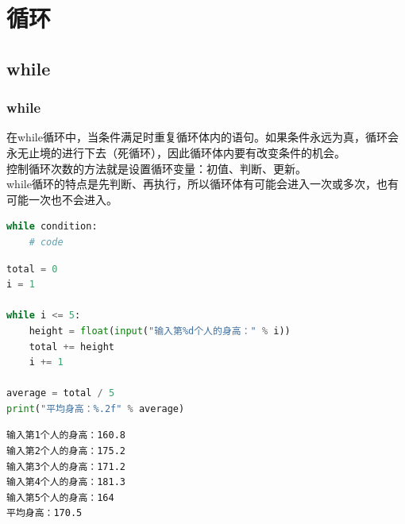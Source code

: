 \chapter{循环}

\section{while}

\subsection{while}

在while循环中，当条件满足时重复循环体内的语句。如果条件永远为真，循环会永无止境的进行下去（死循环），因此循环体内要有改变条件的机会。\\

控制循环次数的方法就是设置循环变量：初值、判断、更新。\\

while循环的特点是先判断、再执行，所以循环体有可能会进入一次或多次，也有可能一次也不会进入。

\vspace{-0.5cm}

\begin{lstlisting}[language=Python]
while condition:
    # code
\end{lstlisting}

\vspace{0.5cm}


\begin{lstlisting}[language=Python]
total = 0
i = 1

while i <= 5:
    height = float(input("输入第%d个人的身高：" % i))
    total += height
    i += 1

average = total / 5
print("平均身高：%.2f" % average)
\end{lstlisting}

\begin{tcolorbox}
    \begin{verbatim}
输入第1个人的身高：160.8
输入第2个人的身高：175.2
输入第3个人的身高：171.2
输入第4个人的身高：181.3
输入第5个人的身高：164
平均身高：170.5
\end{verbatim}
\end{tcolorbox}

\vspace{0.5cm}


